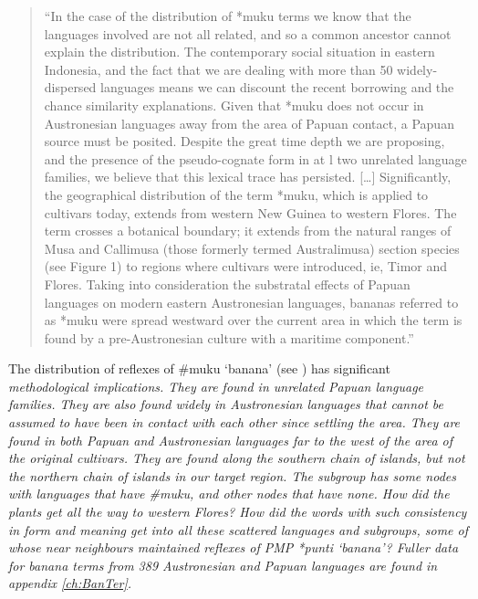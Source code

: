 \begin{quote}
	“In the case of the distribution of *muku terms we know that
	the languages involved are not all related,
	and so a common ancestor cannot explain the distribution.
	The contemporary social situation in eastern Indonesia,
	and the fact that we are dealing with more than 50 widely-dispersed
	languages means we can discount the recent borrowing
	and the chance similarity explanations.
	Given that *muku does not occur in Austronesian languages away
	from the area of Papuan contact,
	a Papuan source must be posited.
	Despite the great time depth we are proposing,
	and the presence of the pseudo-cognate form in at l two unrelated
	language families, we believe that this lexical trace has persisted.
	[{\ldots}] Significantly, the geographical distribution of the
	term *muku, which is applied to cultivars today,
	extends from western New Guinea to western Flores.
	The term crosses a botanical boundary; it extends from the natural
	ranges of Musa and Callimusa (those formerly termed Australimusa) section species
	(see Figure 1) to regions where cultivars were introduced,
	ie, Timor and Flores.
	Taking into consideration the substratal effects of Papuan languages
	on modern eastern Austronesian languages,
	bananas referred to as *muku were spread westward over the current
	area in which the term is found by a pre-Austronesian culture
	with a maritime component.” \citep[25]{DenhamDonohue2009}
\end{quote}

The distribution of reflexes of {\#}muku ‘banana’ (see )
has significant \it{methodological implications}.
They are found in unrelated Papuan language families.
They are also found widely in Austronesian languages that cannot
be assumed to have been in contact with each other since settling the area.
They are found in both Papuan
and Austronesian languages far to the west of the area of the original cultivars.
They are found along the southern chain of islands,
but not the northern chain of islands in our target region.
The  subgroup has some nodes with
languages that have {\#}muku,
and other nodes that have none.
How did the plants get all the way to western Flores? How did
the words with such consistency in form
and meaning get into all these scattered languages
and subgroups, some of whose near neighbours maintained reflexes
of PMP *punti ‘banana’?
Fuller data for banana terms from 389 Austronesian
and Papuan languages are found in appendix \ref{ch:BanTer}.